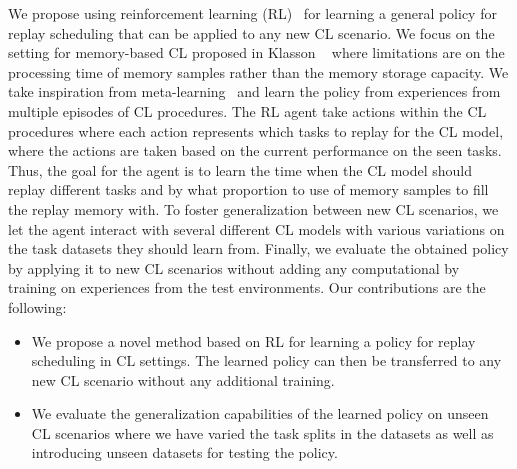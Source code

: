 We propose using reinforcement learning (RL)~ for learning a general policy for replay scheduling that can be applied to any new CL scenario. We focus on the setting for memory-based CL proposed in Klasson \etal~ where limitations are on the processing time of memory samples rather than the memory storage capacity. We take inspiration from meta-learning~ and learn the policy from experiences from multiple episodes of CL procedures. The RL agent take actions within the CL procedures where each action represents which tasks to replay for the CL model, where the actions are taken based on the current performance on the seen tasks. Thus, the goal for the agent is to learn the time when the CL model should replay different tasks and by what proportion to use of memory samples to fill the replay memory with.
To foster generalization between new CL scenarios, we let the agent interact with several different CL models with various variations on the task datasets they should learn from. Finally, we evaluate the obtained policy by applying it to new CL scenarios without adding any computational by training on experiences from the test environments. Our contributions are the following:
\begin{itemize}[topsep=1pt,] %
    \item We propose a novel method based on RL for learning a policy for replay scheduling in CL settings. The learned policy can then be transferred to any new CL scenario without any additional training.
    \item We evaluate the generalization capabilities of the learned policy on unseen CL scenarios where we have varied the task splits in the datasets as well as introducing unseen datasets for testing the policy. 
\end{itemize} 




